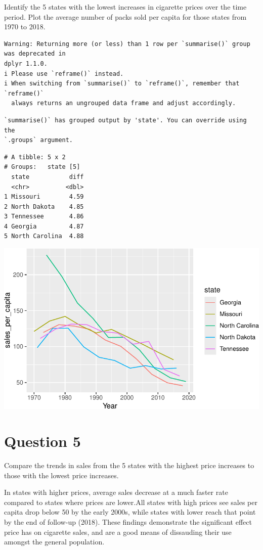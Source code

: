 \documentclass[
]{article}
\begin{document}
Identify the 5 states with the lowest increases in cigarette prices over
the time period. Plot the average number of packs sold per capita for
those states from 1970 to 2018.

\begin{verbatim}
Warning: Returning more (or less) than 1 row per `summarise()` group was deprecated in
dplyr 1.1.0.
i Please use `reframe()` instead.
i When switching from `summarise()` to `reframe()`, remember that `reframe()`
  always returns an ungrouped data frame and adjust accordingly.
\end{verbatim}

\begin{verbatim}
`summarise()` has grouped output by 'state'. You can override using the
`.groups` argument.
\end{verbatim}

\begin{verbatim}
# A tibble: 5 x 2
# Groups:   state [5]
  state           diff
  <chr>          <dbl>
1 Missouri        4.59
2 North Dakota    4.85
3 Tennessee       4.86
4 Georgia         4.87
5 North Carolina  4.88
\end{verbatim}

\includegraphics{ephraim-m-hwk3-3_files/figure-pdf/unnamed-chunk-4-1.pdf}

\section{Question 5}\label{question-5}

Compare the trends in sales from the 5 states with the highest price
increases to those with the lowest price increases.

In states with higher prices, average sales decrease at a much faster
rate compared to states where prices are lower.All states with high
prices see sales per capita drop below 50 by the early 2000s, while
states with lower reach that point by the end of follow-up (2018). These
findings demonstrate the significant effect price has on cigarette
sales, and are a good means of dissauding their use amongst the general
population.
\end{document}
